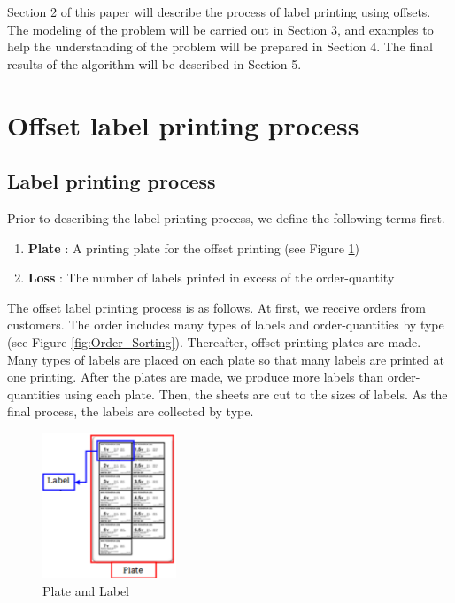 \documentclass[a4paper]{amsart}
\numberwithin{equation}{section} %
\numberwithin{figure}{section} %
\numberwithin{table}{section}
\theoremstyle{plain}
\theoremstyle{definition}
\theoremstyle{plain}
\theoremstyle{plain}
\theoremstyle{plain}
\theoremstyle{plain}
\theoremstyle{plain}
\begin{document}
Section 2 of this paper will describe the process of label printing using offsets. The modeling of the problem will be carried out in Section 3, and examples to help the understanding of the problem will be prepared in Section 4. The final results of the algorithm will be described in Section 5. 


\section{Offset label printing process}\label{sec:Offset}

\subsection{Label printing process}\label{subsec:LabelPrinting}
Prior to describing the label printing process, we define the following terms first.
\begin{enumerate}[*]
	\item {\bf Plate} : A printing plate for the offset printing (see Figure \ref{fig:PlateLabel})
	\item {\bf Loss} : The number of labels printed in excess of the order-quantity
\end{enumerate}

The offset label printing process is as follows. At first, we receive orders from customers. The order includes many types of labels and order-quantities by type (see Figure \ref{fig:Order_Sorting}). Thereafter, offset printing plates are made. Many types of labels are placed on each plate so that many labels are printed at one printing. After the plates are made, we produce more labels than order-quantities using each plate. Then, the sheets are cut to the sizes of labels. As the final process, the labels are collected by type.

\begin{figure}
	\includegraphics[width=4cm]{PlateLabel.pdf}
	\caption{Plate and Label}
	\label{fig:PlateLabel}       %
\end{figure}
\end{document}
